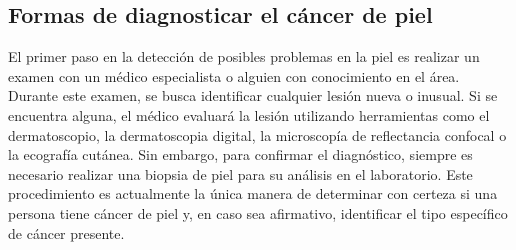\subsection{Formas de diagnosticar el cáncer de piel}
El primer paso en la detección de posibles problemas en la piel es realizar un examen con un médico especialista o alguien con conocimiento en el área. Durante este examen, se busca identificar cualquier lesión nueva o inusual. Si se encuentra alguna, el médico evaluará la lesión utilizando herramientas como el dermatoscopio, la dermatoscopia digital, la microscopía de reflectancia confocal o la ecografía cutánea. Sin embargo, para confirmar el diagnóstico, siempre es necesario realizar una biopsia de piel para su análisis en el laboratorio. Este procedimiento es actualmente la única manera de determinar con certeza si una persona tiene cáncer de piel y, en caso sea afirmativo, identificar el tipo específico de cáncer presente. \parencite{clinica_barcelona}
